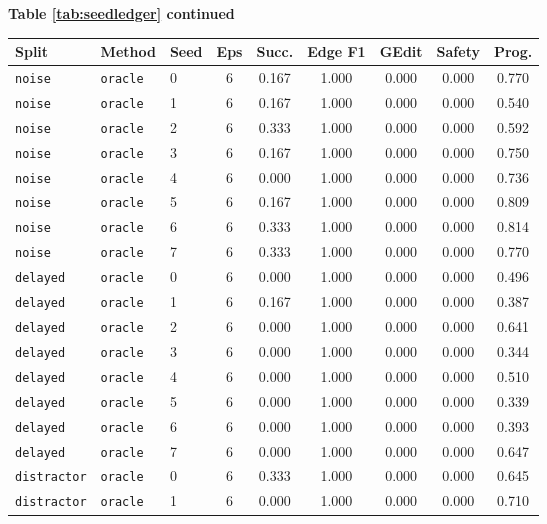 \documentclass{article}
\begin{document}
\begin{center}
\textbf{Table \ref{tab:seedledger} continued}\\[0.4ex]
\begin{tabular}{lllcccccc}
\toprule
Split & Method & Seed & Eps & Succ. & Edge F1 & GEdit & Safety & Prog. \\
\midrule
\texttt{noise} & \texttt{oracle} & 0 & 6 & 0.167 & 1.000 & 0.000 & 0.000 & 0.770 \\
\texttt{noise} & \texttt{oracle} & 1 & 6 & 0.167 & 1.000 & 0.000 & 0.000 & 0.540 \\
\texttt{noise} & \texttt{oracle} & 2 & 6 & 0.333 & 1.000 & 0.000 & 0.000 & 0.592 \\
\texttt{noise} & \texttt{oracle} & 3 & 6 & 0.167 & 1.000 & 0.000 & 0.000 & 0.750 \\
\texttt{noise} & \texttt{oracle} & 4 & 6 & 0.000 & 1.000 & 0.000 & 0.000 & 0.736 \\
\texttt{noise} & \texttt{oracle} & 5 & 6 & 0.167 & 1.000 & 0.000 & 0.000 & 0.809 \\
\texttt{noise} & \texttt{oracle} & 6 & 6 & 0.333 & 1.000 & 0.000 & 0.000 & 0.814 \\
\texttt{noise} & \texttt{oracle} & 7 & 6 & 0.333 & 1.000 & 0.000 & 0.000 & 0.770 \\
\texttt{delayed} & \texttt{oracle} & 0 & 6 & 0.000 & 1.000 & 0.000 & 0.000 & 0.496 \\
\texttt{delayed} & \texttt{oracle} & 1 & 6 & 0.167 & 1.000 & 0.000 & 0.000 & 0.387 \\
\texttt{delayed} & \texttt{oracle} & 2 & 6 & 0.000 & 1.000 & 0.000 & 0.000 & 0.641 \\
\texttt{delayed} & \texttt{oracle} & 3 & 6 & 0.000 & 1.000 & 0.000 & 0.000 & 0.344 \\
\texttt{delayed} & \texttt{oracle} & 4 & 6 & 0.000 & 1.000 & 0.000 & 0.000 & 0.510 \\
\texttt{delayed} & \texttt{oracle} & 5 & 6 & 0.000 & 1.000 & 0.000 & 0.000 & 0.339 \\
\texttt{delayed} & \texttt{oracle} & 6 & 6 & 0.000 & 1.000 & 0.000 & 0.000 & 0.393 \\
\texttt{delayed} & \texttt{oracle} & 7 & 6 & 0.000 & 1.000 & 0.000 & 0.000 & 0.647 \\
\texttt{distractor} & \texttt{oracle} & 0 & 6 & 0.333 & 1.000 & 0.000 & 0.000 & 0.645 \\
\texttt{distractor} & \texttt{oracle} & 1 & 6 & 0.000 & 1.000 & 0.000 & 0.000 & 0.710 \\

\end{tabular}
\end{center}
\end{document}

